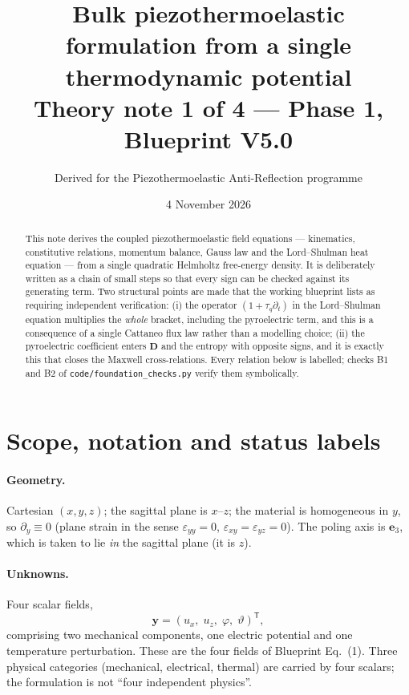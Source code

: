 \documentclass[11pt]{article}
\title{Bulk piezothermoelastic formulation from a single thermodynamic potential\\
\large Theory note 1 of 4 --- Phase 1, Blueprint V5.0}
\author{Derived for the Piezothermoelastic Anti-Reflection programme}
\date{4 November 2026}
\newcommand{\eps}{\varepsilon}
\newcommand{\bth}{\vartheta}
\newcommand{\D}{\bm{D}}
\theoremstyle{plain}
\begin{document}
\maketitle

\begin{abstract}
This note derives the coupled piezothermoelastic field equations --- kinematics,
constitutive relations, momentum balance, Gauss law and the Lord--Shulman heat
equation --- from a single quadratic Helmholtz free-energy density. It is
deliberately written as a chain of small steps so that every sign can be checked
against its generating term. Two structural points are made that the working
blueprint lists as requiring independent verification: (i) the operator
$(1+\tau_q\partial_t)$ in the Lord--Shulman equation multiplies the \emph{whole}
bracket, including the pyroelectric term, and this is a consequence of a single
Cattaneo flux law rather than a modelling choice; (ii) the pyroelectric
coefficient enters $\D$ and the entropy with opposite signs, and it is exactly
this that closes the Maxwell cross-relations. Every relation below is labelled;
checks B1 and B2 of \texttt{code/foundation\_checks.py} verify them symbolically.
\end{abstract}

\section{Scope, notation and status labels}
\label{sec:scope}

\paragraph{Geometry.} Cartesian $(x,y,z)$; the sagittal plane is $x$--$z$;
the material is homogeneous in $y$, so $\partial_y \equiv 0$ (plane strain in the
sense $\eps_{yy}=0$, $\eps_{xy}=\eps_{yz}=0$). The poling axis is $\bm{e}_3$,
which is taken to lie \emph{in} the sagittal plane (it is $z$).

\paragraph{Unknowns.} Four scalar fields,
\begin{equation}
  \bm{y} = (u_x,\; u_z,\; \varphi,\; \bth)^{\mathsf T},
  \label{eq:unknowns}
\end{equation}
comprising two mechanical components, one electric potential and one temperature
perturbation. These are the four fields of Blueprint Eq.~(1). Three physical
categories (mechanical, electrical, thermal) are carried by four scalars; the
formulation is not ``four independent physics''.
\end{document}
